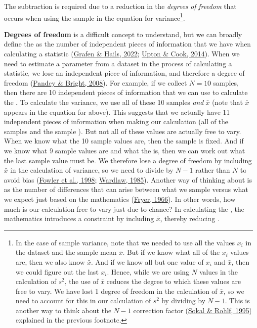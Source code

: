 \documentclass[
  openany]{krantz}
\begin{document}
The subtraction is required due to a reduction in the \emph{degrees of freedom} that occurs when using the sample  in the equation for variance\footnote{In the case of sample variance, note that we needed to use all the values \(x_{i}\) in the dataset and the sample mean \(\bar{x}\). But if we know what all of the \(x_{i}\) values are, then we also know \(\bar{x}\). And if we know all but one value of \(x_{i}\) and \(\bar{x}\), then we could figure out the last \(x_{i}\). Hence, while we are using \(N\) values in the calculation of \(s^{2}\), the use of \(\bar{x}\) reduces the degree to which these values are free to vary. We have lost 1 degree of freedom in the calculation of \(\bar{x}\), so we need to account for this in our calculation of \(s^{2}\) by dividing by \(N - 1\). This is another way to think about the \(N - 1\) correction factor (\protect\hyperlink{ref-Sokal1995}{Sokal \& Rohlf, 1995}) explained in the previous footnote.}.

\textbf{Degrees of freedom} is a difficult concept to understand, but we can broadly define the  as the number of independent pieces of information that we have when calculating a statistic (\protect\hyperlink{ref-Grafen2002}{Grafen \& Hails, 2022}; \protect\hyperlink{ref-Upton2014}{Upton \& Cook, 2014}).
When we need to estimate a parameter from a dataset in the process of calculating a statistic, we lose an independent piece of information, and therefore a degree of freedom (\protect\hyperlink{ref-Pandey2008}{Pandey \& Bright, 2008}).
For example, if we collect \(N = 10\) samples, then there are 10 independent pieces of information that we can use to calculate the .
To calculate the variance, we use all of these 10 samples \emph{and} \(\bar{x}\) (note that \(\bar{x}\) appears in the equation for  above).
This suggests that we actually have 11 independent pieces of information when making our calculation (all of the samples and the sample ).
But not all of these values are actually free to vary.
When we know what the 10 sample values are, then the sample  is fixed.
And if we know what 9 sample values are and what the  is, then we can work out what the last sample value must be.
We therefore lose a degree of freedom by including \(\bar{x}\) in the calculation of variance, so we need to divide by \(N - 1\) rather than \(N\) to avoid bias (\protect\hyperlink{ref-Fowler1998}{Fowler et al., 1998}; \protect\hyperlink{ref-Wardlaw1985}{Wardlaw, 1985}).
Another way of thinking about  is as the number of differences that can arise between what we sample versus what we expect just based on the mathematics (\protect\hyperlink{ref-Fryer1966}{Fryer, 1966}).
In other words, how much is our calculation free to vary just due to chance?
In calculating the , the mathematics introduces a constraint by including \(\bar{x}\), thereby reducing .
\end{document}
